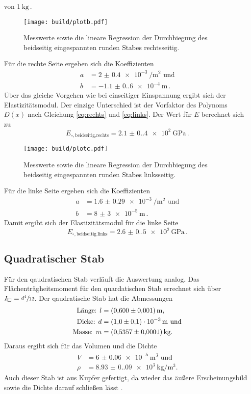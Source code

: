 von $\qty{1}{\kilo\gram}$\,. 
\begin{figure}[H]
    \centering
    \caption{Messwerte sowie die lineare Regression der Durchbiegung des beidseitig eingespannten runden Stabes rechtsseitig.}
    \texttt{[image: build/plotb.pdf]}
    \label{fig:plotb}
\end{figure}
Für die rechte Seite ergeben sich die Koeffizienten 
\begin{align*}
    a&=\qty{2(0.4)e-3}{\per\meter\squared}\text{ und}\\
    b&=\qty{-1.1(0.6)e-4}{\meter}\,.
\end{align*}
Über das gleiche Vorgehen wie bei einseitiger Einspannung ergibt sich der Elastizitätsmodul. Der einzige Unterschied ist 
der Vorfaktor des Polynoms $D(x)$ nach Gleichung \eqref{eq:rechts} und \eqref{eq:links}. Der Wert für $E$ berechnet sich zu
\begin{equation*}
E_{\circ,\text{beidseitig,rechts}}=\qty{2.1(0.4)e2}{\giga\pascal}\,.
\end{equation*}
\begin{figure}[H]
    \centering
    \caption{Messwerte sowie die lineare Regression der Durchbiegung des beidseitig eingespannten runden Stabes linksseitig.}
    \texttt{[image: build/plotc.pdf]}
    \label{fig:plotc}
\end{figure}
Für die linke Seite ergeben sich die Koeffizienten
\begin{align*}
    a&=\qty{1,6(0.29)e-3}{\per\meter\squared}\text{ und}\\
    b&=\qty{8(3)e-5}{\meter}\,.
\end{align*}
Damit ergibt sich der Elastizitätsmodul für die linke Seite
\begin{equation*}
    E_{\circ,\text{beidseitig,links}}=\qty{2.6(0.5)e2}{\giga\pascal}\,.
\end{equation*}
\subsection{Quadratischer Stab}
Für den qaudratischen Stab verläuft die Auswertung analog. Das Flächenträgheitsmoment für den quardatischen Stab errechnet sich
über $I_\square=\sfrac{d^4}{12}$. Der qaudratische Stab hat die Abmessungen 
\begin{align*}
    \text{Länge: } l&=\qty{0,6(0.001)}{\meter},\\
    \text{Dicke: } d&=\qty{1,0(0,1)e-3}{\meter}\text{ und}\\
    \text{Masse: } m&=\qty{0,5357(0.0001)}{\kilo\gram}.
\end{align*}
Daraus ergibt sich für das Volumen und die Dichte 
\begin{align*}
    V&=\qty{6(0.06)e-5}{\meter\cubed}\text{ und}\\
    \rho&=\qty{8.93(0.09)e3}{\kilo\gram\per\meter\cubed}.
\end{align*}
Auch dieser Stab ist aus Kupfer gefertigt, da wieder das äußere Erscheinungsbild sowie die Dichte darauf schließen lässt \cite{Kupfer}.
